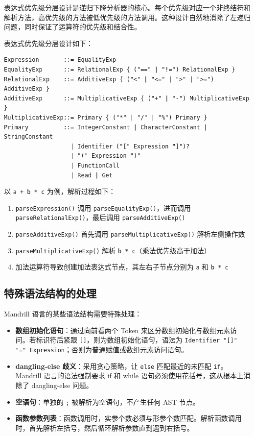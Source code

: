 \documentclass[12pt,hyperref,a4paper,UTF8]{ctexart}
\begin{document}
表达式优先级分层设计是递归下降分析器的核心。每个优先级对应一个非终结符和解析方法，高优先级的方法被低优先级的方法调用。这种设计自然地消除了左递归问题，同时保证了运算符的优先级和结合性。

表达式优先级分层设计如下：

\begin{verbatim}
Expression       ::= EqualityExp
EqualityExp      ::= RelationalExp { ("==" | "!=") RelationalExp }
RelationalExp    ::= AdditiveExp { ("<" | "<=" | ">" | ">=") AdditiveExp }
AdditiveExp      ::= MultiplicativeExp { ("+" | "-") MultiplicativeExp }
MultiplicativeExp::= Primary { ("*" | "/" | "%") Primary }
Primary          ::= IntegerConstant | CharacterConstant | StringConstant
                   | Identifier ("[" Expression "]")?
                   | "(" Expression ")"
                   | FunctionCall
                   | Read | Get
\end{verbatim}

以 \texttt{a + b * c} 为例，解析过程如下：
\begin{enumerate}
    \item \texttt{parseExpression()} 调用 \texttt{parseEqualityExp()}，进而调用 \texttt{parseRelationalExp()}，最后调用 \texttt{parseAdditiveExp()}
    \item \texttt{parseAdditiveExp()} 首先调用 \texttt{parseMultiplicativeExp()} 解析左侧操作数
    \item \texttt{parseMultiplicativeExp()} 解析 \texttt{b * c}（乘法优先级高于加法）
    \item 加法运算符导致创建加法表达式节点，其左右子节点分别为 \texttt{a} 和 \texttt{b * c}
\end{enumerate}

\subsection{特殊语法结构的处理}

Mandrill 语言的某些语法结构需要特殊处理：

\begin{itemize}
    \item \textbf{数组初始化语句}：通过向前看两个 Token 来区分数组初始化与数组元素访问。若标识符后紧跟 \texttt{[]}，则为数组初始化语句，语法为 \texttt{Identifier "[]" "=" Expression}；否则为普通赋值或数组元素访问语句。
    \item \textbf{dangling-else 歧义}：采用贪心策略，让 \texttt{else} 匹配最近的未匹配 \texttt{if}。Mandrill 语言的语法强制要求 if 和 while 语句必须使用花括号，这从根本上消除了 dangling-else 问题。
    \item \textbf{空语句}：单独的 \texttt{;} 被解析为空语句，不产生任何 AST 节点。
    \item \textbf{函数参数列表}：函数调用时，实参个数必须与形参个数匹配。解析函数调用时，首先解析左括号，然后循环解析参数直到遇到右括号。
\end{itemize}
\end{document}
